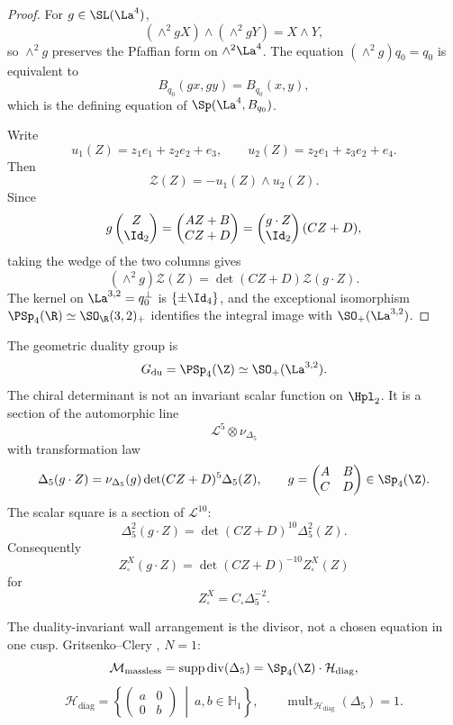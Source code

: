 \begin{proof}
For $g\in\SL(\La^4)$,
$$
(\wedge^2gX)\wedge(\wedge^2gY)=X\wedge Y,
$$
so $\wedge^2g$ preserves the Pfaffian form on $\wedge^2\La^4$.
The equation $(\wedge^2g)q_0=q_0$ is equivalent to
$$
B_{q_0}(gx,gy)=B_{q_0}(x,y),
$$
which is the defining equation of $\Sp(\La^4,B_{q_0})$.

Write
$$
u_1(Z)=z_1e_1+z_2e_2+e_3,\qquad
u_2(Z)=z_2e_1+z_3e_2+e_4.
$$
Then
$$
\mathcal Z(Z)=-u_1(Z)\wedge u_2(Z).
$$
Since
$$
g\begin{pmatrix}Z\\ \Id_2\end{pmatrix}
=
\begin{pmatrix}AZ+B\\ CZ+D\end{pmatrix}
=
\begin{pmatrix}g\cdot Z\\ \Id_2\end{pmatrix}(CZ+D),
$$
taking the wedge of the two columns gives
$$
(\wedge^2g)\mathcal Z(Z)
=\det(CZ+D)\mathcal Z(g\cdot Z).
$$
The kernel on $\La^{3,2}=q_0^\perp$ is $\{\pm\Id_4\}$, and the
exceptional isomorphism $\PSp_4(\R)\simeq\SO_{\R}(3,2)_+$ identifies
the integral image with $\SO_+(\La^{3,2})$.
\end{proof}

\begin{definition}
The geometric duality group is
$$
G_{\mathrm{du}}=\PSp_4(\Z)\simeq\SO_+(\La^{3,2}).
$$
The chiral determinant is not an invariant scalar function on $\Hpl_2$.
It is a section of the automorphic line
$$
\mathcal L^5\otimes\nu_{\Delta_5}
$$
with transformation law
$$
\Delta_5(g\cdot Z)
=\nu_{\Delta_5}(g)\det(CZ+D)^5\Delta_5(Z),
\qquad
g=\begin{pmatrix}A&B\\ C&D\end{pmatrix}\in\Sp_4(\Z).
$$
The scalar square is a section of $\mathcal L^{10}$:
$$
\Delta_5^2(g\cdot Z)=\det(CZ+D)^{10}\Delta_5^2(Z).
$$
Consequently
$$
Z^X_{\square}(g\cdot Z)
=\det(CZ+D)^{-10}Z^X_{\square}(Z)
$$
for
$$
Z^X_{\square}=C_{\square}\Delta_5^{-2}.
$$
\end{definition}

The duality-invariant wall arrangement is the divisor, not a chosen
equation in one cusp.  Gritsenko--Clery \cite{GC}, $N=1$:
$$
\mathcal M_{\mathrm{massless}}
=\operatorname{supp}\operatorname{div}(\Delta_5)
=\Sp_4(\Z)\cdot\mathcal H_{\mathrm{diag}},
$$
$$
\mathcal H_{\mathrm{diag}}
=\left\{
\begin{pmatrix}a&0\\0&b\end{pmatrix}
\ \middle|\ a,b\in\mathbb H_1
\right\},
\qquad
\operatorname{mult}_{\mathcal H_{\mathrm{diag}}}(\Delta_5)=1.
$$

